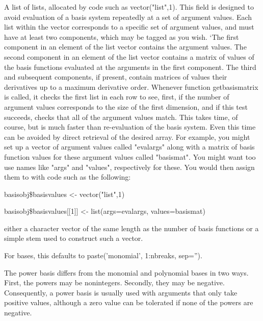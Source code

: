 \documentclass{article}
\begin{document}
\begin{Arguments}
\begin{ldescription}
\item[\code{basisvalues}] A list of lists, allocated by code such as vector("list",1).  This
field is designed to avoid evaluation of a basis system repeatedly
at a set of argument values.  Each list within the vector
corresponds to a specific set of argument values, and must have at
least two components, which may be tagged as you wish.  `The first
component in an element of the list vector contains the argument
values.  The second component in an element of the list vector
contains a matrix of values of the basis functions evaluated at the
arguments in the first component.  The third and subsequent
components, if present, contain matrices of values their derivatives
up to a maximum derivative order.  Whenever function getbasismatrix
is called, it checks the first list in each row to see, first, if
the number of argument values corresponds to the size of the first
dimension, and if this test succeeds, checks that all of the
argument values match.  This takes time, of course, but is much
faster than re-evaluation of the basis system.  Even this time can
be avoided by direct retrieval of the desired array.  For example,
you might set up a vector of argument values called "evalargs" along
with a matrix of basis function values for these argument values
called "basismat".  You might want too use names like "args" and
"values", respectively for these.  You would then assign them to
 with code such as the following:

basisobj\$basisvalues <- vector("list",1)

basisobj\$basisvalues[[1]] <- list(args=evalargs,
values=basismat)

\item[\code{names}] either a character vector of the same length as the number of basis
functions or a simple stem used to construct such a vector.

For  bases, this defaults to paste('monomial',
1:nbreaks, sep='').

\end{ldescription}
\end{Arguments}
\begin{Details}\relax
The power basis differs from the monomial and polynomial
bases in two ways.  First, the powers may be nonintegers.
Secondly, they may be negative.  Consequently, a power
basis is usually used with arguments that only take
positive values, although a zero value can be tolerated
if none of the powers are negative.
\end{Details}
\end{document}
